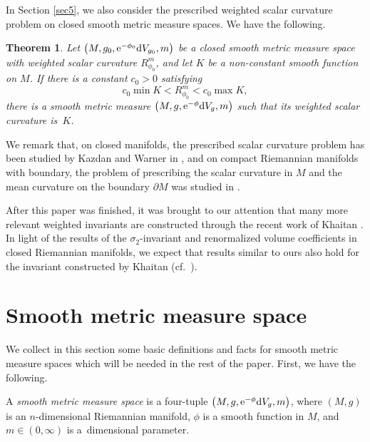 \documentclass[10pt,a4paper]{amsart}
\numberwithin{equation}{section}
\newtheorem{Theorem}{Theorem}[section]
\begin{document}
In Section \ref{sec5}, we also consider the prescribed weighted scalar curvature problem on closed smooth metric measure spaces.
We have the following.
\begin{Theorem}\label{thm1.3}
 Let $\bigl(M,g_0,{\rm e}^{-\phi_0}{\rm d}V_{g_0},m\bigr)$ be a closed smooth metric measure space with weighted scalar curvature $R_{\phi_0}^m$, and let $K$ be a non-constant smooth function on $M$. If there is a constant $c_0>0$ satisfying
\begin{equation*}
c_0\min K<R_{\phi_0}^m<c_0\max K,
\end{equation*}
there is a smooth metric measure $\bigl(M,g,{\rm e}^{-\phi}{\rm d}V_g,m\bigr)$ such that its weighted scalar curvature is~$K$.
\end{Theorem}

We remark that, on closed manifolds, the prescribed scalar curvature problem has been studied by Kazdan and Warner in \cite{Kazdan&Warner1, Kazdan&Warner4, Kazdan&Warner2, Kazdan&Warner3},
and on compact Riemannian manifolds with boundary, the problem of prescribing the scalar curvature in $M$ and the mean curvature on the boundary $\partial M$ was studied in \cite{Cruz&Vitorio, Ho&Huang}.


 After this paper was finished,
it was brought to our attention that many more relevant weighted invariants are
constructed through the recent work of Khaitan \cite{Khaitan1,Khaitan2}. In light of the results of the $\sigma_2$-invariant and renormalized volume coefficients in closed Riemannian manifolds, we expect that results similar to ours also hold for the invariant constructed by Khaitan (cf.~\cite{Andrade,Silva1}).

\section{Smooth metric measure space}

We collect in this section some basic definitions and facts for smooth metric measure spaces
which will be needed in the rest of the paper.
First, we have the following.

\begin{Definition}
 A \textit{smooth metric measure space} is a four-tuple $\bigl(M,g,{\rm e}^{-\phi}{\rm d}V_g,m\bigr)$,
 where $(M,g)$ is an $n$-dimensional Riemannian manifold, $\phi$ is a smooth function in $M$, and $m\in(0,\infty)$ is a~dimensional parameter.
\end{Definition}
\end{document}
